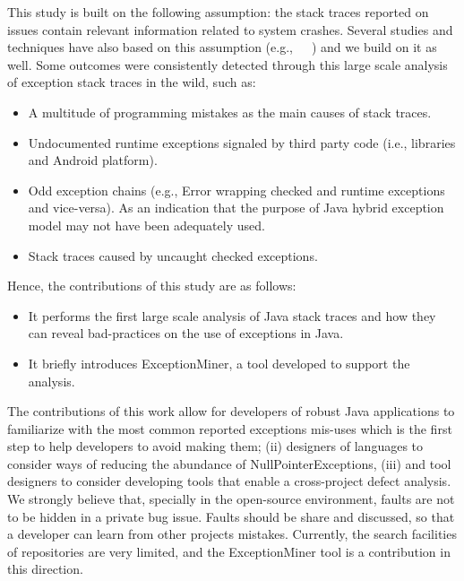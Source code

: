 \documentclass[conference]{IEEEtran}
\begin{document}
This study is built on the following assumption: the stack traces reported on
issues contain relevant information related to system crashes. Several studies
and techniques have also based on this assumption
(e.g.,~\cite{sinha2009fault}~\cite{dhaliwal2011classifying}~\cite{kim2013predicting})
and we build on it as well. Some outcomes were consistently detected through
this large scale analysis of exception stack traces in the wild, such as:

\begin{itemize}

  \item  A multitude of programming mistakes as the main causes of stack traces.
   
  \item Undocumented runtime exceptions signaled by third party
    code (i.e., libraries and Android platform).

  \item  Odd exception chains (e.g., Error wrapping checked and runtime
    exceptions and vice-versa). As an indication that the purpose of Java hybrid
    exception model may not have been adequately used.

  \item  Stack traces caused by uncaught checked exceptions.

\end{itemize}

Hence, the contributions of this study are as follows:
\begin{itemize}

  \item  It performs the first large scale analysis of Java stack traces and how
    they can reveal bad-practices on the use of exceptions in Java.

  \item  It briefly introduces ExceptionMiner, a tool developed to support the
    analysis.

\end{itemize}


The contributions of this work allow for developers of robust Java applications
to familiarize with the most common reported exceptions mis-uses which is the
first step to help developers to avoid making them; (ii) designers of languages
to consider ways of reducing the abundance of NullPointerExceptions, (iii) and
tool designers to consider developing tools that enable a cross-project defect
analysis. We strongly believe that, specially in the open-source environment,
faults are not to be hidden in a private bug issue. Faults should be share and
discussed, so that a developer can learn from other projects mistakes.
Currently, the search facilities of repositories are very limited, and the
ExceptionMiner tool is a contribution in this direction.
\end{document}
